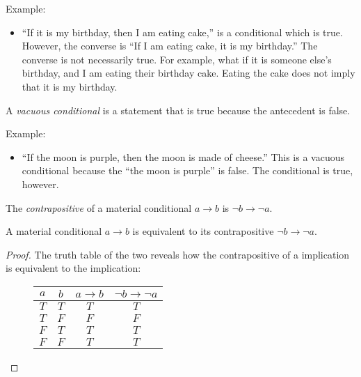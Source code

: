 Example:
\begin{itemize}
    \item ``If it is my birthday, then I am eating cake,'' is a conditional which is true. However, the converse is ``If I am eating cake, it is my birthday.''
    The converse is not necessarily true. For example, what if it is someone else's birthday, and I am eating their birthday cake. Eating the cake does not 
    imply that it is my birthday. 
\end{itemize}

\bigskip
\begin{definition}
    A \emph{vacuous conditional} is a statement that is true because the antecedent is false. 
\end{definition}

Example:
\begin{itemize}
    \item ``If the moon is purple, then the moon is made of cheese.'' This is a vacuous conditional because the ``the moon is purple'' is false. The 
    conditional is true, however.
\end{itemize}

\begin{definition}
    The \emph{contrapositive} of a material conditional \(a\rightarrow b\) is \(\lnot b\rightarrow\lnot a\).
\end{definition}

\begin{proposition}
    A material conditional \(a\rightarrow b\) is equivalent to its contrapositive \newline\(\lnot b\rightarrow\lnot a\).
\end{proposition}
\begin{proof}
    The truth table of the two reveals how the contrapositive of a implication is equivalent to the implication:
    \begin{figure}[H]
        \centering
        \begin{tabular}{cccc}
            \(a\) & \(b\) & \(a\rightarrow b\) & \(\lnot b\rightarrow\lnot a\) \\
            \hline
            \(T\) & \(T\) & \(T\) & \(T\) \\
            \(T\) & \(F\) & \(F\) & \(F\) \\
            \(F\) & \(T\) & \(T\) & \(T\) \\
            \(F\) & \(F\) & \(T\) & \(T\)
        \end{tabular}
    \end{figure}
\end{proof}

